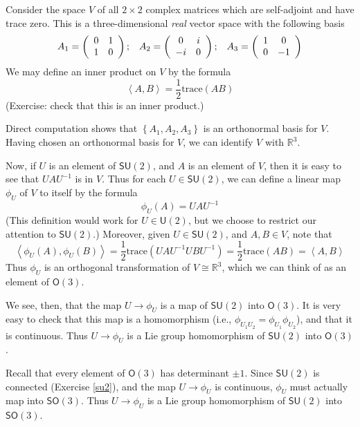 \documentclass{amsbook}
\theoremstyle{plain}
\numberwithin{equation}{chapter}
\numberwithin{theorem}{chapter}
\begin{document}
Consider the space $V$ of all $2\times2$ complex matrices which are
self-adjoint and have trace zero. This is a three-dimensional \textit{real}
vector space with the following basis
\[%
\begin{array}
[c]{ccc}%
A_{1}=\left(
\begin{array}
[c]{cc}%
0 & 1\\
1 & 0
\end{array}
\right)  ; & A_{2}=\left(
\begin{array}
[c]{cc}%
0 & i\\
-i & 0
\end{array}
\right)  ; & A_{3}=\left(
\begin{array}
[c]{cc}%
1 & 0\\
0 & -1
\end{array}
\right)
\end{array}
\]
We may define an inner product on $V$ by the formula
\[
\left\langle A,B\right\rangle =\frac12\mathrm{trace}(AB)
\]
(Exercise: check that this is an inner product.)

Direct computation shows that $\left\{  A_{1},A_{2},A_{3}\right\}  $ is an
orthonormal basis for $V$. Having chosen an orthonormal basis for $V$, we can
identify $V$ with $\mathbb{R}^{3}$.

Now, if $U$ is an element of $\mathsf{SU}(2)$, and $A$ is an element of $V$,
then it is easy to see that $UAU^{-1}$ is in $V$. Thus for each $U\in
\mathsf{SU}(2)$, we can define a linear map $\phi_{U}$ of $V$ to itself by the
formula
\[
\phi_{U}(A)=UAU^{-1}%
\]
(This definition would work for $U\in\mathsf{U}(2)$, but we choose to restrict
our attention to $\mathsf{SU}(2)$.) Moreover, given $U\in\mathsf{SU}(2)$, and
$A,B\in V$, note that
\[
\left\langle \phi_{U}(A),\phi_{U}(B)\right\rangle =\frac12\mathrm{trace}%
(UAU^{-1}UBU^{-1})=\frac12\mathrm{trace}(AB)=\left\langle A,B\right\rangle
\]
Thus $\phi_{U}$ is an orthogonal transformation of $V\cong\mathbb{R}^{3}$,
which we can think of as an element of $\mathsf{O}(3)$.

We see, then, that the map $U\rightarrow\phi_{U}$ is a map of $\mathsf{SU}(2)
$ into $\mathsf{O}(3)$. It is very easy to check that this map is a
homomorphism (i.e., $\phi_{U_{1}U_{2}}=\phi_{U_{1}}\phi_{U_{2}}$), and that it
is continuous. Thus $U\rightarrow\phi_{U}$ is a Lie group homomorphism of
$\mathsf{SU}(2)$ into $\mathsf{O}(3)$.

Recall that every element of $\mathsf{O}(3)$ has determinant $\pm1$. Since
$\mathsf{SU}(2)$ is connected (Exercise \ref{su2}), and the map $U\rightarrow
\phi_{U}$ is continuous, $\phi_{U}$ must actually map into $\mathsf{SO}(3)$.
Thus $U\rightarrow\phi_{U}$ is a Lie group homomorphism of $\mathsf{SU}(2)$
into $\mathsf{SO}(3)$.
\end{document}
